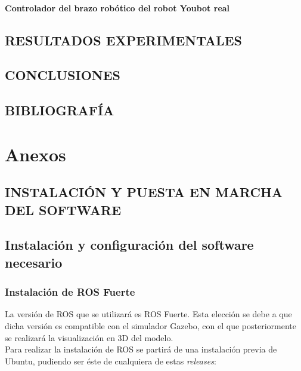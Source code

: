 \documentclass[10pt, a4paper]{report}
\begin{document}
\subsection{Controlador del brazo robótico del robot Youbot real}


\chapter{RESULTADOS EXPERIMENTALES}



\chapter{CONCLUSIONES}



\chapter{BIBLIOGRAFÍA}



\part{Anexos}

\appendix

\chapter{INSTALACIÓN Y PUESTA EN MARCHA DEL SOFTWARE}


\chapter{Instalación y configuración del software necesario}

\section{Instalación de ROS Fuerte}

La versión de ROS que se utilizará es ROS Fuerte. Esta elección se debe a que dicha versión es compatible con el simulador Gazebo, con el que posteriormente se realizará la visualización en 3D del modelo.\\

Para realizar la instalación de ROS  se partirá de una instalación previa de Ubuntu, pudiendo ser éste de cualquiera de estas \textit{releases}:
\end{document}
